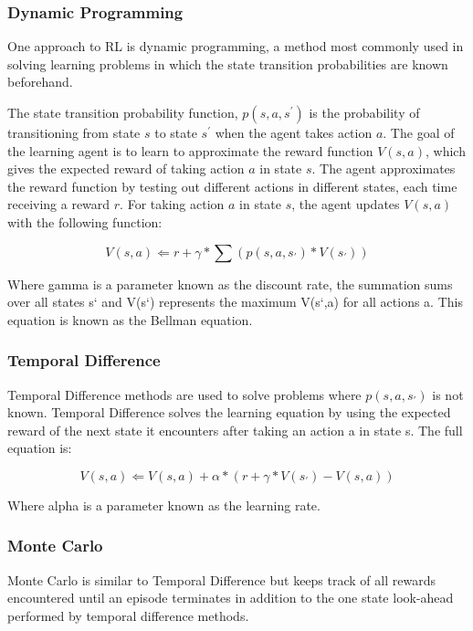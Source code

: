 \documentclass[a4paper,oneside]{report}
\begin{document}
\subsubsection{Dynamic Programming} 

One approach to RL is dynamic programming, a method most commonly used in solving learning problems in which the state transition probabilities are known beforehand.

The state transition probability function, $p(s,a,s^\prime)$ is the probability of transitioning from state $s$ to state $s^\prime$ when the agent takes action $a$. The goal of the learning agent is to learn to approximate the reward function $V(s,a)$, which gives the expected reward of taking action $a$ in state $s$. The agent approximates the reward function by testing out different actions in different states, each time receiving a reward $r$. For taking action $a$ in state $s$, the agent updates $V(s,a)$ with the following function:

\begin{equation*}
V(s,a) \Leftarrow r + \gamma * \sum(p(s, a, s_\prime) * V(s_\prime))
\end{equation*}

Where gamma is a parameter known as the discount rate, the summation sums over all states s` and V(s`) represents the maximum V(s`,a) for all actions a. This equation is known as the Bellman equation.

\subsubsection{Temporal Difference} 

Temporal Difference methods are used to solve problems where $p(s,a,s_\prime)$ is not known. Temporal Difference solves the learning equation by using the expected reward of the next state it encounters after taking an action a in state s. The full equation is:

\begin{equation*}
V(s,a) \Leftarrow V(s,a) + \alpha * ( r + \gamma * V(s_\prime) - V(s,a) )
\end{equation*}

Where alpha is a parameter known as the learning rate. 

\subsubsection{Monte Carlo} 

Monte Carlo is similar to Temporal Difference but keeps track of all rewards encountered until an episode terminates in addition to the one state look-ahead performed by temporal difference methods.
\end{document}
